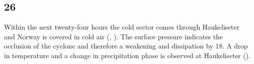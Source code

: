 \subsection*{\SI{26}{\dec}}
Within the next twenty-four hours the cold sector comes through Haukeliseter and Norway is covered in cold air (, ). The surface pressure indicates the occlusion of the cyclone and therefore a weakening and dissipation by \SI{18}{\UTC}. A drop in temperature and a change in precipitation phase is observed at Haukeliseter ().
